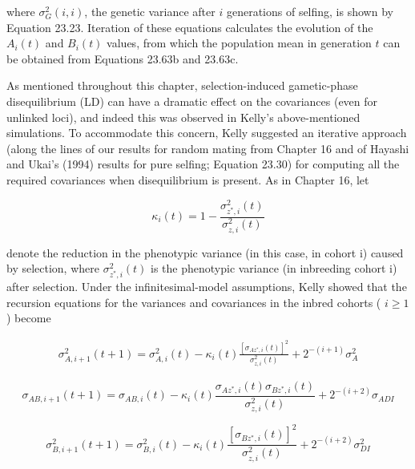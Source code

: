 \documentclass{article}
\begin{document}
where  $ \sigma_G^2(i,i) $, the genetic variance after  $ i $ generations of selfing, is shown by Equation 23.23. Iteration of these equations calculates the evolution of the  $ A_i(t) $ and  $ B_i(t) $ values, from which the population mean in generation  $ t $ can be obtained from Equations 23.63b and 23.63c.

As mentioned throughout this chapter, selection-induced gametic-phase disequilibrium (LD) can have a dramatic effect on the covariances (even for unlinked loci), and indeed this was observed in Kelly's above-mentioned simulations. To accommodate this concern, Kelly suggested an iterative approach (along the lines of our results for random mating from Chapter 16 and of Hayashi and Ukai's (1994) results for pure selfing; Equation 23.30) for computing all the required covariances when disequilibrium is present. As in Chapter 16, let

\begin{equation}
\kappa_{i}(t)=1-\frac{\sigma_{z^{*},i}^{2}(t)}{\sigma_{z,i}^{2}(t)}
\tag{23.66}
\label{eq:23_66}
\end{equation}

denote the reduction in the phenotypic variance (in this case, in cohort i) caused by selection, where  $ \sigma_{z^{*},i}^{2}(t) $ is the phenotypic variance (in inbreeding cohort i) after selection. Under the infinitesimal-model assumptions, Kelly showed that the recursion equations for the variances and covariances in the inbred cohorts ( $ i \geq 1 $) become

\begin{equation}
\begin{align*}\sigma^2_{A,i+1}(t+1)=\sigma^2_{A,i}(t)-\kappa_i(t)\frac{\left[\sigma_{Az^*,i}(t)\right]^2}{\sigma^2_{z,i}(t)}+2^{-(i+1)}\sigma^2_A\end{align*}
\tag{23.67a}
\label{eq:23_67a}
\end{equation}

\begin{equation}
\sigma_{AB,i+1}(t+1)=\sigma_{AB,i}(t)-\kappa_{i}(t)\frac{\sigma_{Az^{*},i}(t)\sigma_{Bz^{*},i}(t)}{\sigma_{z,i}^{2}(t)}+2^{-(i+2)}\sigma_{ADI}
\tag{23.67b}
\label{eq:23_67b}
\end{equation}

\begin{equation}
\sigma_{B,i+1}^{2}(t+1)=\sigma_{B,i}^{2}(t)-\kappa_{i}(t)\frac{\left[\sigma_{B z^{*},i}(t)\right]^{2}}{\sigma_{z,i}^{2}(t)}+2^{-(i+2)}\sigma_{D I}^{2}
\tag{23.67c}
\label{eq:23_67c}
\end{equation}
\end{document}

